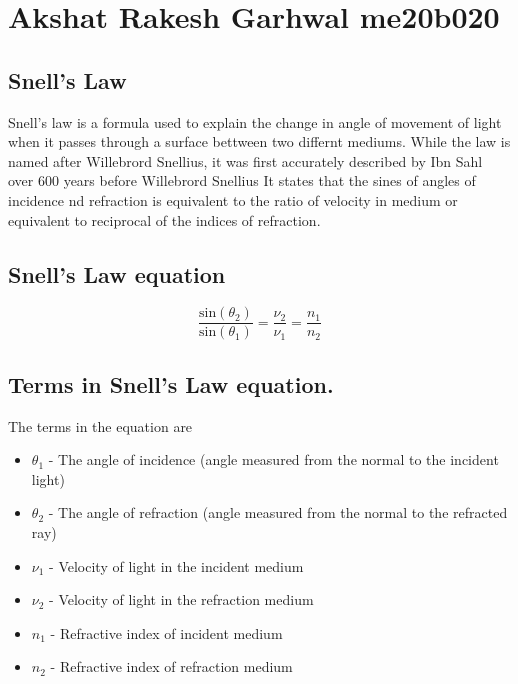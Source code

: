 \section{Akshat Rakesh Garhwal me20b020}
\subsection{Snell's Law}
Snell's law \cite{Snell} is a formula used to explain the change in angle of movement of light when it passes through a surface bettween two differnt mediums.
While the law is named after Willebrord Snellius, it was first accurately described by Ibn Sahl over 600 years before Willebrord Snellius
It states that the sines of angles of incidence nd refraction is equivalent to the ratio of velocity in medium or equivalent to reciprocal of the indices of refraction.
\subsection{Snell's Law equation}
\begin{equation}
	\frac {\text{sin}(\theta_{2})}{\text{sin}(\theta_{1})}  = \frac {\nu_{2}}{\nu_{1}} = {\frac  {n_{1}}{n_{2}}}
\end{equation}
\subsection{Terms in Snell's Law equation.}
The terms in the equation are 
\begin{itemize}
\item $\theta_{1}$ - The angle of incidence (angle measured from the normal to the incident light) 
\item $\theta_{2}$ - The angle of refraction (angle measured from the normal to the refracted ray)
\item $\nu_{1}$ - Velocity of light in the incident medium
\item $\nu_{2}$ - Velocity of light in the refraction medium
\item $n_{1}$ - Refractive index of incident medium
\item $n_{2}$ - Refractive index of refraction medium
\end{itemize}
